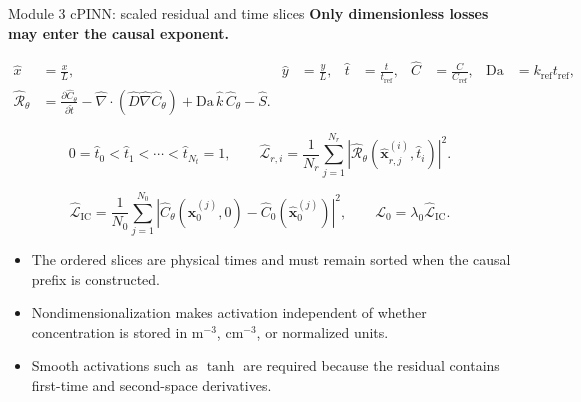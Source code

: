 \documentclass[aspectratio=169,10pt]{beamer}
\begin{document}
\begin{frame}{Module 3 cPINN: scaled residual and time slices}
\footnotesize
\textbf{Only dimensionless losses may enter the causal exponent.}

\vspace{-0.15em}
\begin{align*}
\hat x&=\frac{x}{L},&
\hat y&=\frac{y}{L},&
\hat t&=\frac{t}{t_{\mathrm{ref}}},&
\widehat C&=\frac{C}{C_{\mathrm{ref}}},&
\mathrm{Da}&=k_{\mathrm{ref}}t_{\mathrm{ref}},\\[-0.1em]
\widehat{\mathcal R}_{\theta}
&=
\frac{\partial\widehat C_{\theta}}{\partial\hat t}
-\hat\nabla\cdot
\left(\widehat D\hat\nabla\widehat C_{\theta}\right)
+\mathrm{Da}\,\hat k\,\widehat C_{\theta}
-\widehat S.
\end{align*}

\vspace{-0.25em}
\begin{equation*}
0=\hat t_0<\hat t_1<\cdots<\hat t_{N_t}=1,
\qquad
\widehat{\mathcal L}_{r,i}
=
\frac{1}{N_r}\sum_{j=1}^{N_r}
\left|
\widehat{\mathcal R}_{\theta}
(\hat{\mathbf x}_{r,j}^{(i)},\hat t_i)
\right|^2.
\end{equation*}

\vspace{-0.25em}
\begin{equation*}
\widehat{\mathcal L}_{\mathrm{IC}}
=
\frac{1}{N_0}\sum_{j=1}^{N_0}
\left|
\widehat C_{\theta}(\hat{\mathbf x}_0^{(j)},0)
-\widehat C_0(\hat{\mathbf x}_0^{(j)})
\right|^2,
\qquad
\mathcal L_0=\lambda_0\widehat{\mathcal L}_{\mathrm{IC}}.
\end{equation*}

\vspace{-0.15em}
\begin{itemize}
    \item The ordered slices are physical times and must remain sorted when the causal prefix is constructed.
    \item Nondimensionalization makes activation independent of whether concentration is stored in $\mathrm{m}^{-3}$, $\mathrm{cm}^{-3}$, or normalized units.
    \item Smooth activations such as $\tanh$ are required because the residual contains first-time and second-space derivatives.
\end{itemize}
\end{frame}
\end{document}
